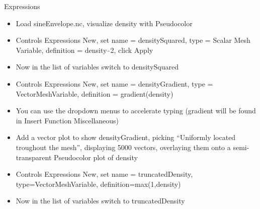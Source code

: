 \begin{frame}{Expressions}
  \begin{beamerboxesrounded}[upper=block head,lower=block body,shadow=true]{}
    \begin{itemize}\setlength{\itemsep}{0mm}
    \item Load sineEnvelope.nc, visualize density with Pseudocolor
    \item Controls \ra Expressions \ra New, set name = densitySquared, type = Scalar Mesh Variable,
      definition = density$\hat{\,\,\,}$2, click Apply
    \item Now in the list of variables switch to densitySquared
    \end{itemize}
  \end{beamerboxesrounded}
  \medskip
  \pause
  \begin{beamerboxesrounded}[upper=block head,lower=block body,shadow=true]{}
    \begin{itemize}\setlength{\itemsep}{0mm}
    \item Controls \ra Expressions \ra New, set name = densityGradient, type = VectorMeshVariable,
      definition = gradient(density)
    \item You can use the dropdown menus to accelerate typing (gradient
      will be found in Insert Function \ra Miscellaneous)
    \item Add a vector plot to show densityGradient, picking ``Uniformly located troughout the mesh'',
      displaying 5000 vectors, overlaying them onto a semi-transparent Pseudocolor plot of density
    \end{itemize}
  \end{beamerboxesrounded}
  \medskip
  \pause
  \begin{beamerboxesrounded}[upper=block head,lower=block body,shadow=true]{}
    \begin{itemize}\setlength{\itemsep}{0mm}
    \item Controls \ra Expressions \ra New, set name = truncatedDensity, type=VectorMeshVariable,
      definition=max(1,density)
    \item Now in the list of variables switch to truncatedDensity
    \end{itemize}
  \end{beamerboxesrounded}
\end{frame}

